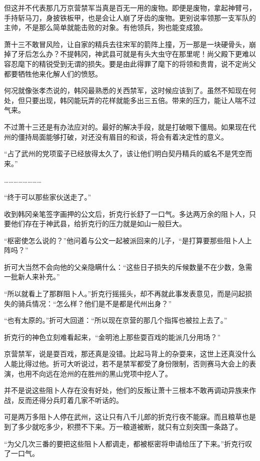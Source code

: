 但这并不代表那几万京营禁军当真是百无一用的废物。即便是废物，拿起神臂弓，手持斩马刀，身披铁板甲，也是会让人崩了牙齿的废物。更别说率领那一支军队的主帅，不是那么简单就能击败的对象。有他领兵，狗也能变成狼。

萧十三不敢冒风险，让自家的精兵去往宋军的箭阵上撞，万一那是一块硬骨头，崩掉了牙后怎么办？不提韩冈，神武县可就是有头大虫守在那里呢！尚父殿下更难以容忍麾下的精锐受到无谓的损失。要是由此得罪了麾下的将领和贵胄，说不定尚父都要牺牲他来化解人们的愤怒。

何况就像张孝杰说的，韩冈最熟悉的关西禁军，这时候应该到了。虽然不知现在何处，但只要出现，韩冈能玩弄的花样就能多出三五倍。带来的压力，能让人喘不过气来。

不过萧十三还是有办法应对的。最好的解决手段，就是打破眼下僵局。如果现在代州的僵持局面能够打破，对还没有眉目的和谈，将会有着决定性的意义。

“占了武州的党项蛮子已经放得太久了，该让他们明白契丹精兵的威名不是凭空而来。”

……………………

“终于可以那些家伙送走了。”

收到韩冈亲笔签字画押的公文后，折克行长舒了一口气。多达两万余的阻卜人，只要他们存在于神武县，给折克行的压力就是如山一般巨大。

“枢密使怎么说的？”他问着与公文一起被派回来的儿子，“是打算要那些阻卜人上阵吗？”

折可大当然不会向他的父亲隐瞒什么：“这些日子损失的斥候数量不在少数，急需一批新人来补充。”

“所以就看上了那群阻卜人。”折克行摇摇头，却不再就此事发表意见，而是问起损失的骑兵情况：“怎么样？他们是不是都是代州出身？”

“也有太原的。”折可大回道：“所以现在京营的那几个指挥也被拉上去了。”

折克行的神色立刻难看起来，“金明池上那些耍百戏的能派几分用场？”

京营禁军，说是耍百戏，那还真是没错。比起马背上的杂耍来，这世上还真没什么人能比得过他。折可大听说过，若不是禁军都受了身份限制，否则赛马大会上的表演，也用不向远在沧州的在胜州的黑山党项中挖人了。

并不是说这些阻卜人存在没有好处，他们的反叛让萧十三根本不敢再调动异族来作战，反而还得分兵盯着几家不听话的。

可是两万多阻卜人停在武州，这让只有八千儿郎的折克行夜不能寐。而且粮草也是到了多少就吃多少，积攒不下来。万一粮道被断，就只有立刻突围一条路了。

“为父几次三番的要把这些阻卜人都调走，都被枢密将申请给压了下来。”折克行叹了一口气。

